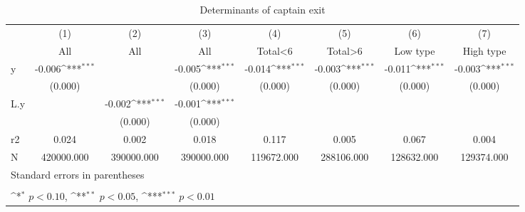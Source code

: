 \begin{table}[htbp]\centering
\def\sym#1{\ifmmode^{#1}\else\(^{#1}\)\fi}
\caption{Determinants of captain exit}
\begin{tabular}{l*{7}{c}}
\hline\hline
                    &\multicolumn{1}{c}{(1)}&\multicolumn{1}{c}{(2)}&\multicolumn{1}{c}{(3)}&\multicolumn{1}{c}{(4)}&\multicolumn{1}{c}{(5)}&\multicolumn{1}{c}{(6)}&\multicolumn{1}{c}{(7)}\\
                    &\multicolumn{1}{c}{All}&\multicolumn{1}{c}{All}&\multicolumn{1}{c}{All}&\multicolumn{1}{c}{Total<6}&\multicolumn{1}{c}{Total>6}&\multicolumn{1}{c}{Low type}&\multicolumn{1}{c}{High type}\\
\hline
y                   &      -0.006\sym{***}&                     &      -0.005\sym{***}&      -0.014\sym{***}&      -0.003\sym{***}&      -0.011\sym{***}&      -0.003\sym{***}\\
                    &     (0.000)         &                     &     (0.000)         &     (0.000)         &     (0.000)         &     (0.000)         &     (0.000)         \\
L.y                 &                     &      -0.002\sym{***}&      -0.001\sym{***}&                     &                     &                     &                     \\
                    &                     &     (0.000)         &     (0.000)         &                     &                     &                     &                     \\
\hline
r2                  &       0.024         &       0.002         &       0.018         &       0.117         &       0.005         &       0.067         &       0.004         \\
N                   &  420000.000         &  390000.000         &  390000.000         &  119672.000         &  288106.000         &  128632.000         &  129374.000         \\
\hline\hline
\multicolumn{8}{l}{\footnotesize Standard errors in parentheses}\\
\multicolumn{8}{l}{\footnotesize  }\\
\multicolumn{8}{l}{\footnotesize \sym{*} \(p<0.10\), \sym{**} \(p<0.05\), \sym{***} \(p<0.01\)}\\
\end{tabular}
\end{table}
